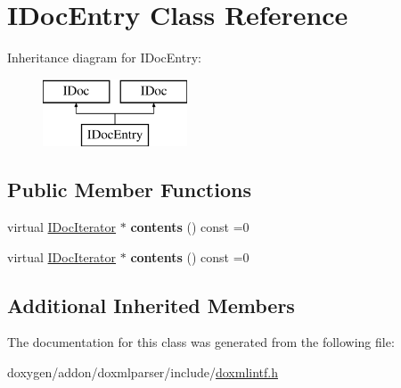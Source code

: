 \hypertarget{class_i_doc_entry}{}\section{I\+Doc\+Entry Class Reference}
\label{class_i_doc_entry}
Inheritance diagram for I\+Doc\+Entry\+:\begin{figure}[H]
\begin{center}
\leavevmode
\includegraphics[height=2.000000cm]{class_i_doc_entry}
\end{center}
\end{figure}
\subsection*{Public Member Functions}
\begin{DoxyCompactItemize}
\item 
\mbox{\label{class_i_doc_entry_abc851ad984bc11c93aada0b8c80e90c3}} 
virtual \mbox{\hyperlink{class_i_doc_iterator}{I\+Doc\+Iterator}} $\ast$ {\bfseries contents} () const =0
\item 
\mbox{\label{class_i_doc_entry_abc851ad984bc11c93aada0b8c80e90c3}} 
virtual \mbox{\hyperlink{class_i_doc_iterator}{I\+Doc\+Iterator}} $\ast$ {\bfseries contents} () const =0
\end{DoxyCompactItemize}
\subsection*{Additional Inherited Members}


The documentation for this class was generated from the following file\+:\begin{DoxyCompactItemize}
\item 
doxygen/addon/doxmlparser/include/\mbox{\hyperlink{include_2doxmlintf_8h}{doxmlintf.\+h}}\end{DoxyCompactItemize}

